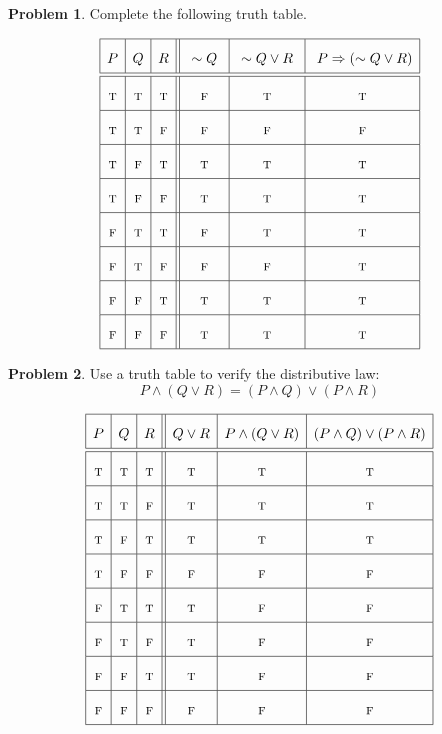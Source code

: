 \documentclass[12pt]{amsart}
\newcounter{problem_number}[section]
\theoremstyle{named}
\theoremstyle{definition}
\newtheorem{problem}{Problem}
\begin{document}
\begin{problem}
	Complete the following truth table.
\end{problem}

$$
\renewcommand{\arraystretch}{2}
\begin{array}{|c|c|c||c|c|c|}
\hline
P&Q&R&\ \sim Q \  &\ \sim Q\vee R\  &\ P\Rightarrow (\sim Q\vee R) \\
\hline\hline
\textsc{t}&\textsc{t}&\textsc{t}& \textsc{f}& \textsc{t}& \textsc{t}\\
\hline
\textsc{t}&\textsc{t}&\textsc{f}& \textsc{f}& \textsc{f}& \textsc{f}\\
\hline
\textsc{t}&\textsc{f}&\textsc{t}& \textsc{t}& \textsc{t}& \textsc{t}\\
\hline
\textsc{t}&\textsc{f}&\textsc{f}& \textsc{t}& \textsc{t}& \textsc{t}\\
\hline
\textsc{f}&\textsc{t}&\textsc{t}& \textsc{f}& \textsc{t}& \textsc{t}\\
\hline
\textsc{f}&\textsc{t}&\textsc{f}& \textsc{f}& \textsc{f}& \textsc{t}\\
\hline
\textsc{f}&\textsc{f}&\textsc{t}& \textsc{t}& \textsc{t}& \textsc{t}\\
\hline
\textsc{f}&\textsc{f}&\textsc{f}& \textsc{t}& \textsc{t}& \textsc{t}\\
\hline
\end{array}
$$


\newpage

\begin{problem}
	Use a truth table to verify the distributive law:
	$$P\wedge(Q\vee R) = (P\wedge Q)\vee(P\wedge R)$$
\end{problem}

$$
\renewcommand{\arraystretch}{2}
\begin{array}{|c|c|c||c|c|c|c|}
\hline
P&Q&R& Q \lor R & P\wedge(Q\vee R) &(P\wedge Q)\vee(P\wedge R)\\
\hline\hline
\textsc{t}&\textsc{t}&\textsc{t}& \textsc{t}& \textsc{t}& \textsc{t}\\
\hline
\textsc{t}&\textsc{t}&\textsc{f}& \textsc{t}& \textsc{t}& \textsc{t}\\
\hline
\textsc{t}&\textsc{f}&\textsc{t}& \textsc{t}& \textsc{t}& \textsc{t}\\
\hline
\textsc{t}&\textsc{f}&\textsc{f}& \textsc{f}& \textsc{f}& \textsc{f}\\
\hline
\textsc{f}&\textsc{t}&\textsc{t}& \textsc{t}& \textsc{f}& \textsc{f}\\
\hline
\textsc{f}&\textsc{t}&\textsc{f}& \textsc{t}& \textsc{f}& \textsc{f}\\
\hline
\textsc{f}&\textsc{f}&\textsc{t}& \textsc{t}& \textsc{f}& \textsc{f}\\
\hline
\textsc{f}&\textsc{f}&\textsc{f}& \textsc{f}& \textsc{f}& \textsc{f}\\
\hline
\end{array}
$$
\end{document}
